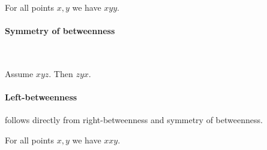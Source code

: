 \documentclass{article}
\newcommand{\Betw}[3]{#1 #2 #3}
\begin{document}
  \begin{forthel}
    \begin{lemma} %
      For all points $x, y$ we have $\Betw{x}{y}{y}$.
    \end{lemma}
  \end{forthel}

  \paragraph{Symmetry of betweenness}\

  \begin{forthel}
    \begin{lemma} %
      Assume $\Betw{x}{y}{z}$. Then $\Betw{z}{y}{x}$.
    \end{lemma}
  \end{forthel}

  \paragraph{Left-betweenness} follows directly
  from right-betweenness and symmetry of betweenness.
  \begin{forthel}
    \begin{lemma} %
      For all points $x, y$ we have  $\Betw{x}{x}{y}$.
    \end{lemma}
  \end{forthel}
\end{document}
